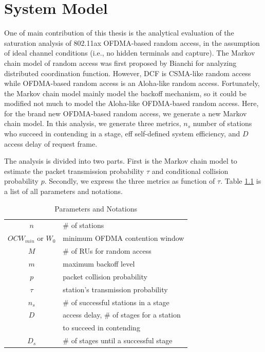\chapter{System Model} 		\label{chp_sys_model}
One of main contribution of this thesis is the analytical evaluation of the saturation analysis of 802.11ax OFDMA-based random access, in the assumption of ideal channel conditions (i.e., no hidden terminals and capture). 
The Markov chain model of random access was first proposed by Bianchi for analyzing distributed coordination function\cite{bianchi2000performance}. 
However, DCF is CSMA-like random access while OFDMA-based random access is an Aloha-like random access.
Fortunately, the Markov chain model mainly model the backoff mechanism, so it could be modified not much to model the Aloha-like OFDMA-based random access.
Here, for the brand new OFDMA-based random access, we generate a new Markov chain model. 
In this analysis, we generate three metrics, $n_s$ number of stations who succeed in contending in a stage, eff self-defined system efficiency, and $D$ access delay of request frame. 

The analysis is divided into two parts. First is the Markov chain model to estimate the packet transmission probability $\tau$ and conditional collision probability $p$. 
Secondly, we express the three metrics as function of $\tau$. 
Table \ref{table_notation} is a list of all parameters and notations.

\begin{table}[!b]
\caption{Parameters and Notations}
\centering
\label{table_notation}
\begin{tabular}{c|l}
\hline
$n$						& $\#$ of stations \\
$OCW_{min}$ or $W_0$		& minimum OFDMA contention window \\
$M$						& $\#$ of RUs for random access \\
$m$						& maximum backoff level \\
$p$						& packet collision probability \\
$\tau$					& station's transmission probability \\
$n_s$					& $\#$ of successful stations in a stage \\
$D$			            & access delay, $\#$ of stages for a station \\ & to succeed in contending \\
$D_s$					& $\#$ of stages until a successful stage \\
\hline
\end{tabular}
\end{table}


